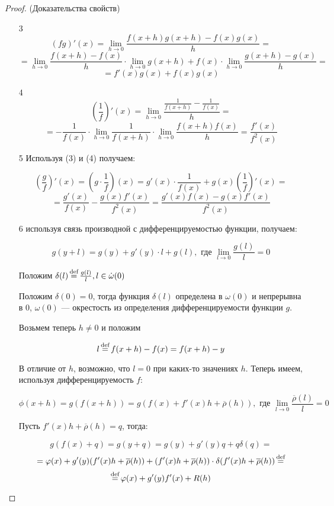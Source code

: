 \begin{proof} (Доказательства свойств)
    \begin{enumerate}
        \item[3] $$(fg)'(x) = \lim\limits_{h \to 0} \frac{f(x+h)g(x + h) - f(x)g(x)}{h} = $$
        $$= \lim\limits_{h \to 0} \frac{f(x + h) - f(x)}{h} \cdot \lim\limits_{h \to 0} g(x + h) + f(x) \cdot \lim\limits_{h \to 0} \frac{g(x+h) - g(x)}{h} = $$
        $$= f'(x)g(x) + f(x)g(x)$$

        \item[4] $$\left(\frac{1}{f}\right)'(x) = \lim\limits_{h \to 0} \frac{\frac{1}{f(x+h)} - \frac{1}{f(x)}}{h} = $$
        $$= - \frac{1}{f(x)} \cdot \lim\limits_{h \to 0} \frac{1}{f(x+h)} \cdot \lim\limits_{h \to 0} \frac{f(x + h)f(x)}{h} = \frac{f'(x)}{f^2(x)}$$

        \item[5] Используя (3) и (4) получаем:
        
        $$\left(\frac{g}{f}\right)'(x) = \left(g \cdot \frac{1}{f}\right) (x) = g'(x) \cdot \frac{1}{f(x)} + g(x) \left(\frac{1}{f}\right)'(x) =$$
        $$= \frac{g'(x)}{f(x)} - \frac{g(x)f'(x)}{f^2(x)} = \frac{g'(x)f(x) - g(x)f'(x)}{f^2(x)}$$

        \item[6] используя связь производной с дифференцируемостью функции, получаем:
        
        $$g(y + l) = g(y) + g'(y)\cdot l + g(l), \text{ где } \lim\limits_{l \to 0} \frac{g(l)}{l} = 0$$

        Положим $\delta(l) \operatorname*{\overset{\text{def}}{=}} \frac{g(l)}{l}, l \in \dot{\omega}(0)$

        Положим $\delta(0) = 0$, тогда функция $\delta(l)$ определена в $\omega(0)$ и непрерывна в 0, $\omega(0)$ --- окрестость из определения дифференцируемости функции $g$.
        
        Возьмем теперь $h \neq 0$ и положим

        $$l \operatorname*{\overset{\text{def}}{=}} f(x + h) - f(x) = f(x + h) - y$$

        В отличие от $h$, возможно, что $l = 0$ при каких-то значениях $h$. Теперь имеем, используя дифференцируемость $f$:
        
        $$\phi(x + h) = g(f(x + h)) = g(f(x) + f'(x)h + \overline{\rho}(h)), \text{ где } \lim\limits_{l \to 0} \frac{\overline{\rho}(l)}{l} = 0$$

        Пусть $f'(x)h + \overline{\rho}(h) = q$, тогда:

        $$g(f(x) + q) = g(y + q) = g(y) + g'(y)q + q\delta(q) = $$
        $$ =\varphi(x) + g'(y)(f'(x)h + \overline{\rho}(h))+(f'(x)h+\overline{\rho}(h)) \cdot \delta(f'(x)h + \overline{\rho}(h)) \operatorname*{\overset{\text{def}}{=}}$$
        $$\operatorname*{\overset{\text{def}}{=}} \varphi(x) + g'(y)f'(x) + R(h)$$ 
        

\end{enumerate}
\end{proof}
